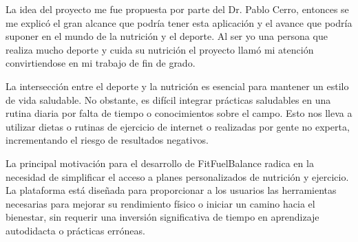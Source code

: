 La idea del proyecto me fue propuesta por parte del Dr. Pablo Cerro, entonces se me explicó el gran alcance que podría tener esta aplicación y el avance que podría suponer en el mundo de la nutrición y el deporte. Al ser yo una persona que realiza mucho deporte y cuida su nutrición el proyecto llamó mi atención convirtiendose en mi trabajo de fin de grado.

La intersección entre el deporte y la nutrición es esencial para mantener un estilo de vida saludable. No obstante, es difícil integrar prácticas saludables en una rutina diaria por falta de tiempo o conocimientos sobre el campo. Esto nos lleva a utilizar dietas o rutinas de ejercicio de internet o realizadas por gente no experta, incrementando el riesgo de resultados negativos.

La principal motivación para el desarrollo de FitFuelBalance radica en la necesidad de simplificar el acceso a planes personalizados de nutrición y ejercicio. La plataforma está diseñada para proporcionar a los usuarios las herramientas necesarias para mejorar su rendimiento físico o iniciar un camino hacia el bienestar, sin requerir una inversión significativa de tiempo en aprendizaje autodidacta o prácticas erróneas.